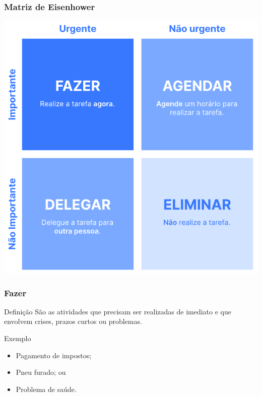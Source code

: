 \documentclass[aspectratio=169]{beamer}
\begin{document}
\begin{frame}
	\frametitle{Matriz de Eisenhower}
	
	\begin{center}
		\includegraphics[scale=0.3]{img/matriz_eisenhower}
	\end{center}
\end{frame}

\begin{frame}
	\frametitle{Fazer}

	\begin{block}{Defini\c cão}
		 São as atividades que precisam ser realizadas de imediato e que envolvem crises, prazos curtos ou problemas.
	\end{block}\vfill

	\begin{exampleblock}{Exemplo}
		\begin{itemize}
		 	\item Pagamento de impostos;
			\item Pneu furado; ou
			\item Problema de saúde.
		\end{itemize}
	\end{exampleblock}
\end{frame}
\end{document}
